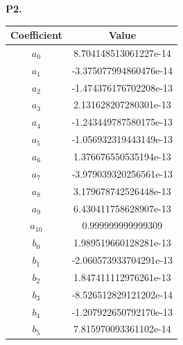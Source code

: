 \documentclass[11pt]{article}
\begin{document}
\bigskip
\newpage
\noindent\textbf{P2.}
\\

\begin{center}
\begin{tabular}{|c|c|}
\hline
Coefficient & Value \\ \hline
$a_0$ & 8.704148513061227e-14 \\ \hline
$a_1$ & -3.375077994860476e-14 \\\hline
$a_2$ & -1.474376176702208e-13 \\\hline
$a_3$ & 2.131628207280301e-13 \\\hline
$a_4$ & -1.243449787580175e-13 \\\hline
$a_5$ & -1.056932319443149e-13 \\\hline
$a_6$ & 1.376676550535194e-13 \\\hline
$a_7$ & -3.979039320256561e-13 \\\hline
$a_8$ & 3.179678742526448e-13 \\\hline
$a_9$ & 6.430411758628907e-13 \\\hline
$a_{10}$ & 0.999999999999309 \\\hline
$b_0$ & 1.989519660128281e-13 \\\hline
$b_1$ & -2.060573933704291e-13 \\\hline
$b_2$ & 1.847411112976261e-13 \\\hline
$b_3$ & -8.526512829121202e-14 \\\hline
$b_4$ & -1.207922650792170e-13 \\\hline
$b_5$ & 7.815970093361102e-14 \\
\hline
\end{tabular}
\end{center}
\begin{figure}[H]
\centering
\end{figure}
\end{document}
